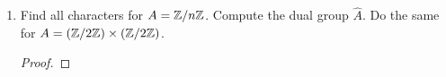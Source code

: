 \documentclass[../psets.tex]{subfiles}
\begin{document}
\begin{enumerate}
\begin{enumerate}
\begin{proof}
            \begin{equation*}
                [\rho_1\otimes\rho_2](g) = \rho_1(g)\cdot\rho_2(g)
            \end{equation*}
            for all $g\in A$. Thus, the tensor product of these representations is the same the character product of their values. Lastly, we have that
            \begin{equation*}
                \rho_1^*(g) = \rho_1(g^{-1})^T
                = \rho_1(g^{-1})
                = \rho_1(g)^{-1}
                = \overline{\rho_1(g)}
            \end{equation*}
            Thus, the dual representation of this representation is computed using the character inverse.
        \end{proof}
        \item Find all characters for $A=\mathbb{Z}/n\mathbb{Z}$. Compute the dual group $\widehat{A}$. Do the same for $A=(\mathbb{Z}/2\mathbb{Z})\times(\mathbb{Z}/2\mathbb{Z})$.
        \begin{proof}


\end{proof}
\end{enumerate}
\end{enumerate}
\end{document}
